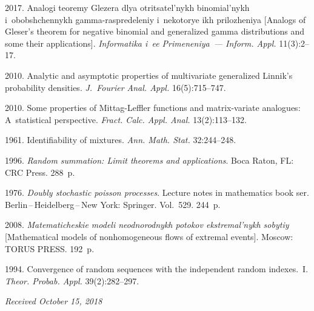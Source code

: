 \begin{multicols}{2}
{{\begin{thebibliography}{99}
 2017. Analogi teoremy Glezera dlya ot\-ri\-tsa\-tel'\-nykh 
binomial'nykh i~obobshchennykh gamma-raspredeleniy i~nekotorye ikh prilozheniya 
[Analogs of Gleser's theorem for negative binomial and generalized
 gamma distributions and some their applications]. 
 \textit{Informatika i~ee Primeneniya~--- Inform. Appl.} 11(3):2--17.

 2010. Analytic and asymptotic properties 
of multivariate generalized Linnik's probability densities. 
\textit{J.~Fourier Anal. Appl.} 16(5):715--747.

 2010. Some properties of Mittag-Leffler functions and
matrix-variate analogues: A~statistical perspective. 
\textit{Fract. Calc. Appl. Anal.} 13(2):113--132.

 1961. Identifiability of mixtures. 
\textit{Ann. Math. Stat.} 32:244--248.

 1996. 
\textit{Random summation: Limit theorems and applications}. 
Boca Raton, FL: CRC Press. 288~p.

 1976. \textit{Doubly stochastic poisson processes}. 
Lecture notes in mathematics book ser. Berlin\,--\,Heidelberg\,--\,New York: 
Springer.  Vol.~529. 244~p.

 2008. \textit{Ma\-te\-ma\-ti\-che\-skie
modeli neodnorodnykh potokov ekstremal'nykh sobytiy}
[Mathematical 
models of nonhomogeneous flows of extremal events]. Moscow: TORUS PRESS. 192~p.  

 1994. Convergence of random sequences with the
independent random indexes.~I. \textit{Theor. Probab. Appl.} 39(2):282--297.
\end{thebibliography}

 }
 }

\end{multicols}

\vspace*{-7pt}

\hfill{\small\textit{Received October 15, 2018}}

\vspace*{-16pt}

\Contr

\vspace*{-4pt}

